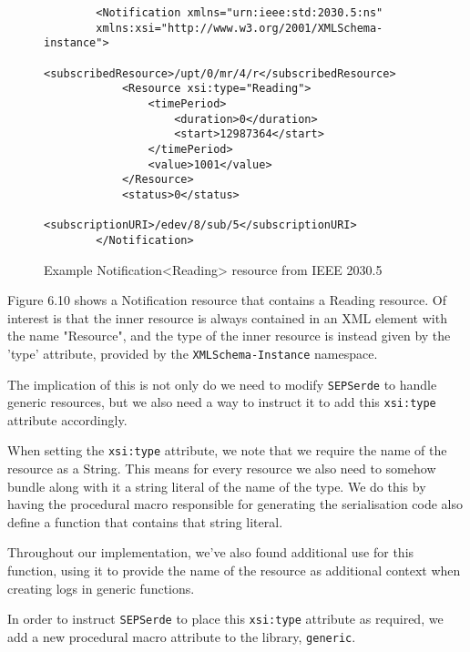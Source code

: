 \begin{figure}[H]
    \begin{center}
        \begin{lstlisting}
        <Notification xmlns="urn:ieee:std:2030.5:ns" 
        xmlns:xsi="http://www.w3.org/2001/XMLSchema-instance">
            <subscribedResource>/upt/0/mr/4/r</subscribedResource>
            <Resource xsi:type="Reading">
                <timePeriod>
                    <duration>0</duration>
                    <start>12987364</start>
                </timePeriod>
                <value>1001</value>
            </Resource>
            <status>0</status>
            <subscriptionURI>/edev/8/sub/5</subscriptionURI>
        </Notification>        
        \end{lstlisting}
        \label{fig:notifxml}
        \caption{Example Notification<Reading> resource from IEEE 2030.5}
    \end{center}
\end{figure}

Figure 6.10 shows a Notification resource that contains a Reading resource. Of interest is that the inner resource is always contained in an XML element with the name "Resource", and the type of the inner resource is instead given by the 'type' attribute, provided by the \texttt{XMLSchema-Instance} namespace. 

The implication of this is not only do we need to modify \texttt{SEPSerde} to handle generic resources, but we also need a way to instruct it to add this  \texttt{xsi:type} attribute accordingly.

When setting the \texttt{xsi:type} attribute, we note that we require the name of the resource as a String. This means for every resource we also need to somehow bundle along with it a string literal of the name of the type. We do this by having the procedural macro responsible for generating the serialisation code also define a function that contains that string literal.

Throughout our implementation, we've also found additional use for this function, using it to provide the name of the resource as additional context when creating logs in generic functions.

In order to instruct \texttt{SEPSerde} to place this \texttt{xsi:type} attribute as required, we add a new procedural macro attribute to the library, \texttt{generic}.

